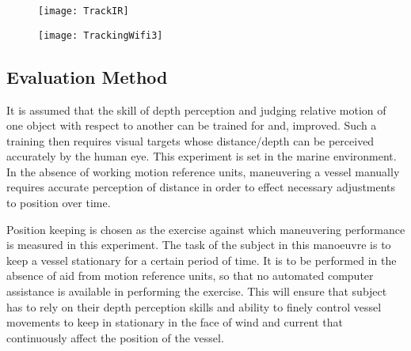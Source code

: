 \begin{figure}[linewidth]
	\centering
	\texttt{[image: TrackIR]}
	\caption{}
	\label{fig:eiffel_marker}
\end{figure}

\begin{figure}[linewidth]
	\centering
	\texttt{[image: TrackingWifi3]}
	\caption{}
	\label{fig:eiffel_marker}
\end{figure}

%
%

\subsection{Evaluation Method}

It is assumed that the skill of depth perception and judging relative motion of one object with respect to another can be trained for and, improved. Such a training then requires visual targets whose distance/depth can be perceived accurately by the human eye. This experiment is set in the marine environment. In the absence of working motion reference units, maneuvering a vessel manually requires accurate perception of distance in order to effect necessary adjustments to position over time. 


Position keeping is chosen as the exercise against which maneuvering performance is measured in this experiment. The task of the subject in this manoeuvre is to keep a vessel stationary for a certain period of time. It is to be performed in the absence of aid from motion reference units, so that no automated computer assistance is available in performing the exercise. This will ensure that subject has to rely on their depth perception skills and ability to finely control vessel movements to keep in stationary in the face of wind and current that continuously affect the position of the vessel. 


